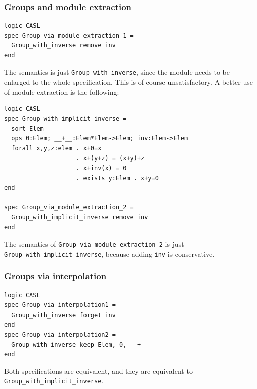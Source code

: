 \documentclass[10pt,fleqn,%
\ifpretendfinal
final%
\else
draft%
\fi,
]{scrreprt}
\newcommand*{\syntax}[1]{\texttt{#1}}
\newcommand{\sssclause}[1]{\subsubsection{#1}}
\begin{document}
\sssclause{Groups and module extraction}

\begin{lstlisting}[basicstyle=\ttfamily,language=dolText,morekeywords={props,ObjectProperty,Class,DisjointUnionOf,SubClassOf,Characteristics,Transitive,Asymmetric,SubPropertyOf,DisjointClasses,EquivalentTo,inverse,only,forall,iff,if,or,exists,sort,ops,spec,forget},escapechar=@,mathescape]
logic CASL
spec Group_via_module_extraction_1 =
  Group_with_inverse remove inv
end
\end{lstlisting}
The semantics is just \syntax{Group\_with\_inverse},
since the module needs to be enlarged to the whole specification.
This is of course unsatisfactory. A better use of module extraction
is the following:

\begin{lstlisting}[basicstyle=\ttfamily,language=dolText,morekeywords={props,ObjectProperty,Class,DisjointUnionOf,SubClassOf,Characteristics,Transitive,Asymmetric,SubPropertyOf,DisjointClasses,EquivalentTo,inverse,only,forall,iff,if,or,exists,sort,ops,spec,forget},escapechar=@,mathescape]
logic CASL
spec Group_with_implicit_inverse =
  sort Elem
  ops 0:Elem; __+__:Elem*Elem->Elem; inv:Elem->Elem
  forall x,y,z:elem . x+0=x
                    . x+(y+z) = (x+y)+z
                    . x+inv(x) = 0
                    . exists y:Elem . x+y=0
end

spec Group_via_module_extraction_2 =
  Group_with_implicit_inverse remove inv
end
\end{lstlisting}
The semantics of \syntax{Group\_via\_module\_extraction\_2} is just
\syntax{Group\_with\_implicit\_inverse}, because adding \texttt{inv}
is conservative.
\medskip

\sssclause{Groups via interpolation}

\begin{lstlisting}[basicstyle=\ttfamily,language=dolText,morekeywords={props,ObjectProperty,Class,DisjointUnionOf,SubClassOf,Characteristics,Transitive,Asymmetric,SubPropertyOf,DisjointClasses,EquivalentTo,inverse,only,forall,iff,if,or,exists,sort,ops,spec,forget},escapechar=@,mathescape]
logic CASL
spec Group_via_interpolation1 =
  Group_with_inverse forget inv
end
spec Group_via_interpolation2 =
  Group_with_inverse keep Elem, 0, __+__
end
\end{lstlisting}
Both specifications are equivalent, and they 
are equivalent to \syntax{Group\_with\_implicit\_inverse}.
\medskip
\end{document}

